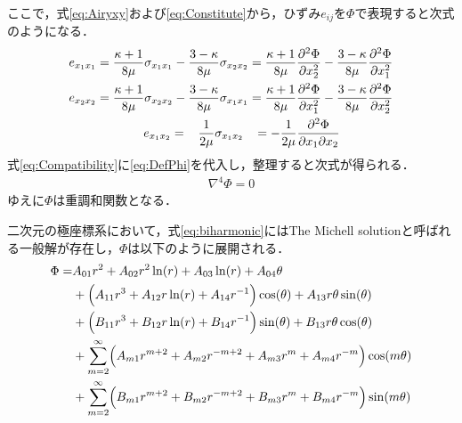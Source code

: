 ここで，式\eqref{eq:Airyxy}および\eqref{eq:Constitute}から，ひずみ$e_{ij}$を$\Phi$で表現すると次式のようになる．
\begin{align}
	e_{x_{1}x_{1}}=\frac{\kappa+1}{8\mu}\sigma_{x_{1}x_{1}}-\frac{3-\kappa}{8\mu}\sigma_{x_{2}x_{2}}
	=\frac{\kappa+1}{8\mu}\frac{\partial^2 \Phi}{\partial x_{2}^2}-\frac{3-\kappa}{8\mu}\frac{\partial^2 \Phi}{\partial x_{1}^2}
	\nonumber
	\\
	e_{x_{2}x_{2}}=\frac{\kappa+1}{8\mu}\sigma_{x_{2}x_{2}}-\frac{3-\kappa}{8\mu}\sigma_{x_{1}x_{1}}
	=\frac{\kappa+1}{8\mu}\frac{\partial^2 \Phi}{\partial x_{1}^2}-\frac{3-\kappa}{8\mu}\frac{\partial^2 \Phi}{\partial x_{2}^2}
	\nonumber
	\\
	e_{x_{1}x_{2}}=\hspace{0.3cm}\frac{1}{2\mu}\sigma_{x_{1}x_{2}}\hspace{0.3cm}
	=-\frac{1}{2\mu}\frac{\partial^2 \Phi}{\partial x_{1} \partial x_{2}}\hspace{1.5cm}
	\label{eq:DefPhi}
\end{align}
式\eqref{eq:Compatibility}に\eqref{eq:DefPhi}を代入し，整理すると次式が得られる．
\begin{align}
	\nabla^4\Phi=0
	\label{eq:biharmonic}
\end{align}
ゆえに$\Phi$は重調和関数となる．

二次元の極座標系において，式\eqref{eq:biharmonic}にはThe Michell solutionと呼ばれる一般解が存在し，$\Phi$は以下のように展開される．
\begin{align}
	\Phi =&A_{01}r^2+A_{02}r^2\ln(r)+A_{03}\ln(r)+A_{04}\theta
	\nonumber
	\\
	&+\Bigl(A_{11}r^3+A_{12}r\ln(r)+A_{14}r^{-1}\Bigr)\cos(\theta)+A_{13}r\theta\sin(\theta)
	\nonumber
	\\
	&+\Bigl(B_{11}r^3+B_{12}r\ln(r)+B_{14}r^{-1}\Bigr)\sin(\theta)+B_{13}r\theta\cos(\theta)
	\nonumber
	\\
	&+\sum_{m=2}^{\infty}\Bigl(A_{m1}r^{m+2}+A_{m2}r^{-m+2}
	+A_{m3}r^{m}+A_{m4}r^{-m}\Bigr)\cos(m\theta)
	\nonumber
	\\
	&+\sum_{m=2}^{\infty}\Bigl(B_{m1}r^{m+2}+B_{m2}r^{-m+2}
	+B_{m3}r^{m}+B_{m4}r^{-m}\Bigr)\sin(m\theta)
	\label{eq:Michell}
\end{align}

